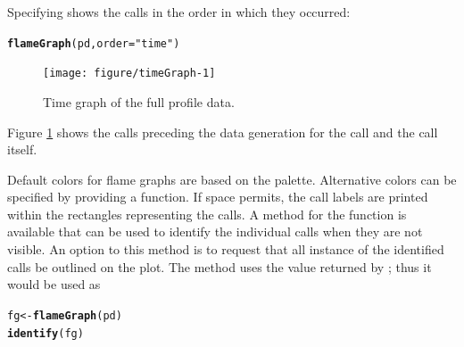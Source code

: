 \documentclass[nojss]{jss}\usepackage[]{graphicx}\usepackage[]{color}
\makeatletter
\newcommand{\hlstr}[1]{\textcolor[rgb]{0.192,0.494,0.8}{#1}}%
\newcommand{\hlstd}[1]{\textcolor[rgb]{0.345,0.345,0.345}{#1}}%
\newcommand{\hlkwb}[1]{\textcolor[rgb]{0.69,0.353,0.396}{#1}}%
\newcommand{\hlkwc}[1]{\textcolor[rgb]{0.333,0.667,0.333}{#1}}%
\newcommand{\hlkwd}[1]{\textcolor[rgb]{0.737,0.353,0.396}{\textbf{#1}}}%
\newenvironment{kframe}{%
 \def\at@end@of@kframe{}%
 \ifinner\ifhmode%
  \def\at@end@of@kframe{\end{minipage}}%
  \begin{minipage}{\columnwidth}%
 \fi\fi%
 \def\FrameCommand##1{\hskip\@totalleftmargin \hskip-\fboxsep
 \colorbox{shadecolor}{##1}\hskip-\fboxsep
     \hskip-\linewidth \hskip-\@totalleftmargin \hskip\columnwidth}%
 \MakeFramed {\advance\hsize-\width
   \@totalleftmargin\z@ \linewidth\hsize
   \@setminipage}}%
 {\par\unskip\endMakeFramed%
 \at@end@of@kframe}
\newenvironment{knitrout}{}{} %
\makeatother
\begin{document}
Specifying  shows the calls in the order in which
they occurred:
\begin{knitrout}\small
{}\color{fgcolor}\begin{kframe}
\begin{alltt}
\hlkwd{flameGraph}\hlstd{(pd,} \hlkwc{order} \hlstd{=} \hlstr{"time"}\hlstd{)}
\end{alltt}
\end{kframe}\begin{figure}

{\centering \texttt{[image: figure/timeGraph-1]} 

}

\caption[Time graph of the full profile data]{Time graph of the full profile data.}\label{fig:timeGraph}
\end{figure}


\end{knitrout}
Figure \ref{fig:timeGraph} shows the  calls preceding the
data generation for the  call and the  call itself.

Default colors for flame graphs are based on the 
palette. Alternative colors can be specified by providing a
 function. If space permits, the call labels are
printed within the rectangles representing the calls. A method for the
 function is available that can be used to identify the
individual calls when they are not visible. An option to this method
is to request that all instance of the identified calls be outlined on
the plot. The  method uses the value returned by
; thus it would be used as
\begin{knitrout}\small
{}\color{fgcolor}\begin{kframe}
\begin{alltt}
\hlstd{fg} \hlkwb{<-} \hlkwd{flameGraph}\hlstd{(pd)}
\hlkwd{identify}\hlstd{(fg)}
\end{alltt}
\end{kframe}
\end{knitrout}
\end{document}
